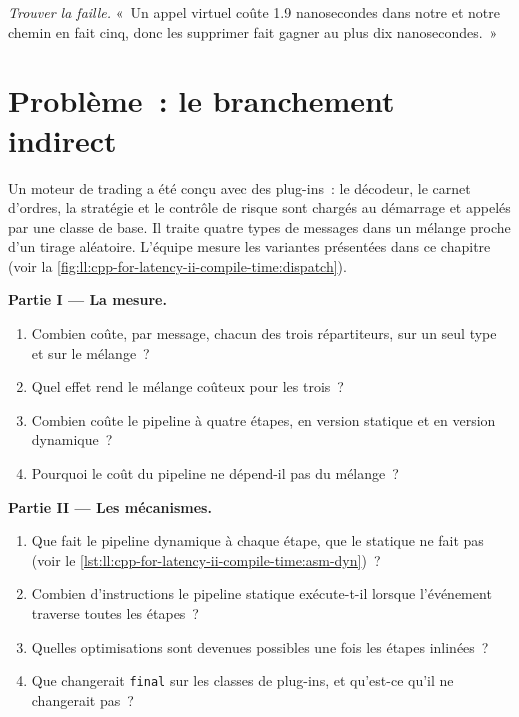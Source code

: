 \begin{exercise}[$\star\star\star$]\label{exo:ll:cpp-for-latency-ii-compile-time:8}
\emph{Trouver la faille.} «~Un appel virtuel coûte 1.9 nanosecondes dans notre  et notre chemin en fait cinq, donc les
supprimer fait gagner au plus dix nanosecondes.~»
\end{exercise}

\section{Problème~: le branchement indirect}

\begin{problem}\label{pb:ll:cpp-for-latency-ii-compile-time:1}
Un moteur de trading a été conçu avec des plug-ins~: le décodeur, le carnet d'ordres, la stratégie et le contrôle de risque sont chargés au démarrage et appelés
par une classe de base. Il traite quatre types de messages dans un mélange proche d'un tirage aléatoire. L'équipe mesure les variantes présentées dans ce
chapitre (voir la \cref{fig:ll:cpp-for-latency-ii-compile-time:dispatch}).

\medskip\noindent\textbf{Partie I --- La mesure.}
\begin{enumerate}
\item Combien coûte, par message, chacun des trois répartiteurs, sur un seul type et sur le mélange~?
\item Quel effet rend le mélange coûteux pour les trois~?
\item Combien coûte le pipeline à quatre étapes, en version statique et en version dynamique~?
\item Pourquoi le coût du pipeline ne dépend-il pas du mélange~?
\end{enumerate}

\medskip\noindent\textbf{Partie II --- Les mécanismes.}
\begin{enumerate}[resume]
\item Que fait le pipeline dynamique à chaque étape, que le statique ne fait pas (voir le \cref{lst:ll:cpp-for-latency-ii-compile-time:asm-dyn})~?
\item Combien d'instructions le pipeline statique exécute-t-il lorsque l'événement traverse toutes les étapes~?
\item Quelles optimisations sont devenues possibles une fois les étapes inlinées~?
\item Que changerait \texttt{final} sur les classes de plug-ins, et qu'est-ce qu'il ne changerait pas~?
\end{enumerate}


\end{problem}
